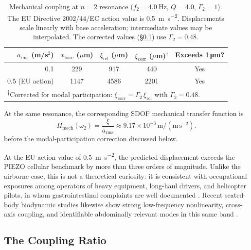\begin{table}[htbp]
  \centering
  \caption{Mechanical coupling at $n=2$ resonance
  ($f_2 = \SI{4.0}{\hertz}$, $Q = 4.0$, $\Gamma_2 = 1$).  The EU Directive 2002/44/EC
  action value is \SI{0.5}{\metre\per\second\squared}.  Displacements scale
  linearly with base acceleration; intermediate values may be interpolated.
  The corrected values (\S\ref{sec:coupling_ratio}) use $\Gamma_2 = 0.48$.}
  \label{tab:mechanical}
  \begin{tabular}{rcccc}
    \toprule
    $a_\mathrm{rms}$ (m/s$^2$) & $x_\mathrm{base}$ ($\mu$m) &
    $\xi_\mathrm{rel}$ ($\mu$m) &
    $\xi_\mathrm{corr}$ ($\mu$m)\textsuperscript{$\dagger$} &
    Exceeds 1\,\si{\micro\metre}? \\
    \midrule
    0.1 & 229  & 917  & 440  & Yes \\
    0.5 (EU action) & 1147  & 4586 & 2201 & Yes \\
    \bottomrule
    \multicolumn{5}{l}{\textsuperscript{$\dagger$}Corrected for
      modal participation: $\xi_\mathrm{corr} = \Gamma_2\,\xi_\mathrm{rel}$
      with $\Gamma_2 = 0.48$.}
  \end{tabular}
\end{table}

At the same resonance, the corresponding SDOF mechanical transfer function is
\begin{equation}
  H_\mathrm{mech}(\omega_2)
  = \frac{\xi}{a_\mathrm{rms}}
  \approx 9.17 \times 10^{-3}\,\mathrm{m}/(\mathrm{m\,s^{-2}}).
  \label{eq:H_mech}
\end{equation}
before the modal-participation correction discussed below.

At the EU action value of \SI{0.5}{\metre\per\second\squared}, the predicted
displacement exceeds the PIEZO cellular benchmark by more than three orders of
magnitude.  Unlike the airborne case, this is not a theoretical curiosity:
it is consistent with occupational exposures among operators of heavy
equipment, long-haul drivers, and helicopter pilots, in whom gastrointestinal
complaints are well documented
\cite{Griffin1990}.  Recent seated-body biodynamic studies likewise
show strong low-frequency nonlinearity, cross-axis coupling, and identifiable
abdominally relevant modes in this same band \cite{Zheng2012,Gao2021}.

\subsection{The Coupling Ratio}
\label{sec:coupling_ratio}

